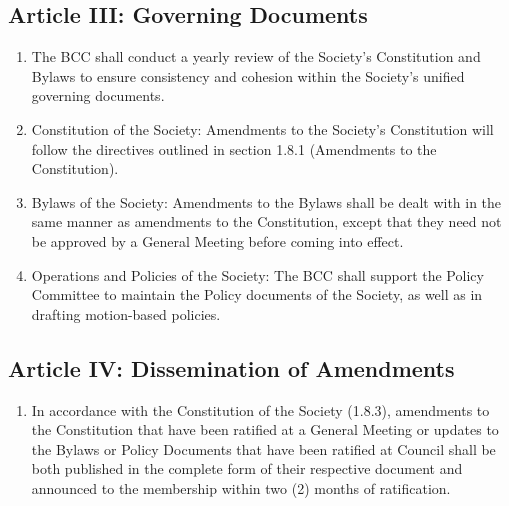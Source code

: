 \subsection{Article III: Governing Documents}
\begin{enumerate}[label*=\arabic*., align=left]	
\item The BCC shall conduct a yearly review of the Society's Constitution and Bylaws to ensure consistency and cohesion within the Society's unified governing documents.
\item Constitution of the Society: Amendments to the Society's Constitution will follow the directives outlined in section 1.8.1 (Amendments to the Constitution).
\item Bylaws of the Society: Amendments to the Bylaws shall be dealt with in the same manner as amendments to the Constitution, except that they need not be approved by a General Meeting before coming into effect.
\item Operations and Policies of the Society: The BCC shall support the Policy Committee to maintain the Policy documents of the Society, as well as in drafting motion-based policies.
\end{enumerate}

\subsection{Article IV: Dissemination of Amendments}
\begin{enumerate}[label*=\arabic*., align=left]	
\item In accordance with the Constitution of the Society (1.8.3), amendments to the Constitution that have been ratified at a General Meeting or updates to the Bylaws or Policy Documents that have been ratified at Council shall be both published in the complete form of their respective document and announced to the membership within two (2) months of ratification.
\end{enumerate}